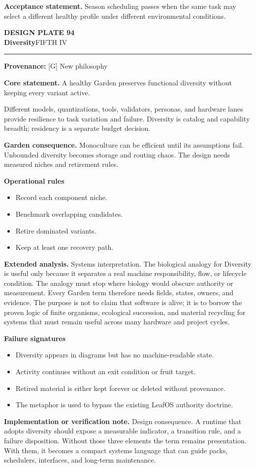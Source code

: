 \documentclass[10pt,letterpaper,oneside]{article}
\newcommand{\prov}[1]{\textcolor{gardenBlue}{\sffamily\footnotesize\textbf{Provenance:} #1}}
\newcommand{\platetitle}[3]{%
  \begin{minipage}[t][0.54in][t]{\textwidth}
  {\sffamily\bfseries\color{gardenDeep}\fontsize{9}{10}\selectfont DESIGN PLATE #1}\\[-1pt]
  {\sffamily\bfseries\color{gardenInk}\fontsize{16.5}{18}\selectfont #2}\hfill{\sffamily\color{gardenGreen}\large #3}
  \end{minipage}\vspace{-2pt}\hrule\vspace{5pt}}
\begin{document}
\begin{acceptbox}
\textbf{Acceptance statement.} Season scheduling passes when the same task may select a different healthy profile under different environmental conditions.
\end{acceptbox}
\newpage
\platetitle{94}{Diversity}{FIFTH IV}
\prov{[G] New philosophy}
\fontsize{8.85}{10.45}\selectfont
\begin{corebox}
\textbf{Core statement.} A healthy Garden preserves functional diversity without keeping every variant active.
\end{corebox}
Different models, quantizations, tools, validators, personas, and hardware lanes provide resilience to task variation and failure. Diversity is catalog and capability breadth; residency is a separate budget decision.

\textbf{Garden consequence.} Monoculture can be efficient until its assumptions fail. Unbounded diversity becomes storage and routing chaos. The design needs measured niches and retirement rules.

\textbf{Operational rules}
\begin{itemize}
\item Record each component niche.
\item Benchmark overlapping candidates.
\item Retire dominated variants.
\item Keep at least one recovery path.
\end{itemize}
\textbf{Extended analysis.} Systems interpretation. The biological analogy for Diversity is useful only because it separates a real machine responsibility, flow, or lifecycle condition. The analogy must stop where biology would obscure authority or measurement. Every Garden term therefore needs fields, states, owners, and evidence. The purpose is not to claim that software is alive; it is to borrow the proven logic of finite organisms, ecological succession, and material recycling for systems that must remain useful across many hardware and project cycles.

\textbf{Failure signatures}
\begin{itemize}
\item Diversity appears in diagrams but has no machine-readable state.
\item Activity continues without an exit condition or fruit target.
\item Retired material is either kept forever or deleted without provenance.
\item The metaphor is used to bypass the existing LeafOS authority doctrine.
\end{itemize}
\textbf{Implementation or verification note.} Design consequence. A runtime that adopts diversity should expose a measurable indicator, a transition rule, and a failure disposition. Without those three elements the term remains presentation. With them, it becomes a compact systems language that can guide packs, schedulers, interfaces, and long-term maintenance.
\end{document}
